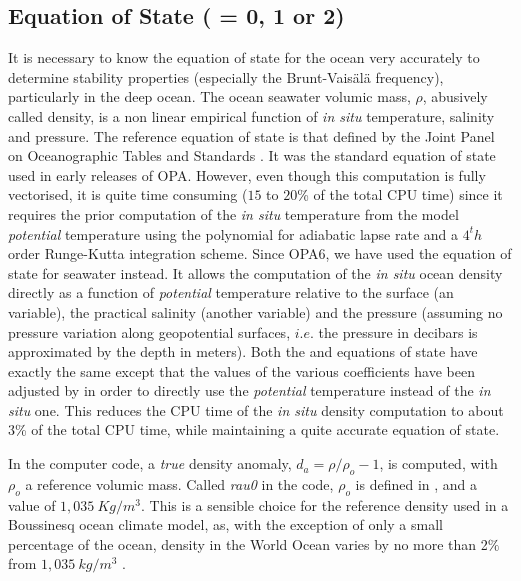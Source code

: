 \subsection{Equation of State ( = 0, 1 or 2)}
\label{TRA_eos}

It is necessary to know the equation of state for the ocean very accurately 
to determine stability properties (especially the Brunt-Vais\"{a}l\"{a} frequency), 
particularly in the deep ocean. The ocean seawater volumic mass, $\rho$, 
abusively called density, is a non linear empirical function of \textit{in situ} 
temperature, salinity and pressure. The reference equation of state is that 
defined by the Joint Panel on Oceanographic Tables and Standards 
\citep{UNESCO1983}. It was the standard equation of state used in early 
releases of OPA. However, even though this computation is fully vectorised, 
it is quite time consuming ($15$ to $20${\%} of the total CPU time) since 
it requires the prior computation of the \textit{in situ} temperature from the 
model \textit{potential} temperature using the \citep{Bryden1973} polynomial 
for adiabatic lapse rate and a $4^th$ order Runge-Kutta integration scheme. 
Since OPA6, we have used the \citet{JackMcD1995} equation of state for 
seawater instead. It allows the computation of the \textit{in situ} ocean density 
directly as a function of \textit{potential} temperature relative to the surface 
(an \NEMO variable), the practical salinity (another \NEMO variable) and the 
pressure (assuming no pressure variation along geopotential surfaces, $i.e.$ 
the pressure in decibars is approximated by the depth in meters). 
Both the \citet{UNESCO1983} and \citet{JackMcD1995} equations of state 
have exactly the same except that the values of the various coefficients have 
been adjusted by \citet{JackMcD1995} in order to directly use the \textit{potential} 
temperature instead of the \textit{in situ} one. This reduces the CPU time of the 
\textit{in situ} density computation to about $3${\%} of the total CPU time, 
while maintaining a quite accurate equation of state.

In the computer code, a \textit{true} density anomaly, $d_a= \rho / \rho_o - 1$, 
is computed, with $\rho_o$ a reference volumic mass. Called \textit{rau0} 
in the code, $\rho_o$ is defined in , and a value of $1,035~Kg/m^3$. 
This is a sensible choice for the reference density used in a Boussinesq ocean 
climate model, as, with the exception of only a small percentage of the ocean, 
density in the World Ocean varies by no more than 2$\%$ from $1,035~kg/m^3$ 
\citep{Gill1982}.

